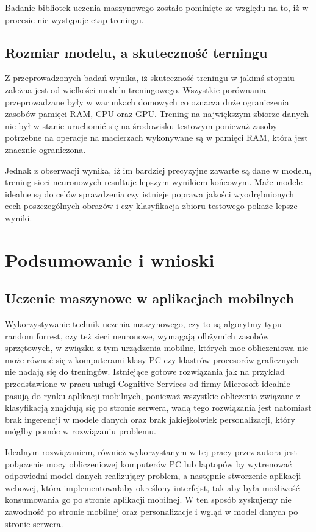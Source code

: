 \documentclass[brudnopis]{xmgr}
\begin{document}
Badanie bibliotek uczenia maszynowego zostało pominięte ze względu na to, iż w procesie nie występuje etap treningu.

\section{Rozmiar modelu, a skuteczność terningu}

Z przeprowadzonych badań wynika, iż skuteczność treningu w jakimś stopniu zależna jest od wielkości modelu treningowego. Wszystkie porównania przeprowadzane były w warunkach domowych co oznacza duże ograniczenia zasobów pamięci RAM, CPU oraz GPU. Trening na największym zbiorze danych nie był w stanie uruchomić się na środowisku testowym ponieważ zasoby potrzebne na operacje na macierzach wykonywane są w pamięci RAM, która jest znacznie ograniczona. 

Jednak z obserwacji wynika, iż im bardziej precyzyjne zawarte są dane w modelu, trening sieci neuronowych resultuje lepszym wynikiem końcowym. Małe modele idealne są do celów sprawdzenia czy istnieje poprawa jakości wyodrębnionych cech poszczególnych obrazów i czy klasyfikacja zbioru testowego pokaże lepsze wyniki.

\chapter{Podsumowanie i wnioski}

\section{Uczenie maszynowe w aplikacjach mobilnych}

Wykorzystywanie technik uczenia maszynowego, czy to są algorytmy typu random forrest, czy też sieci neuronowe, wymagają olbżymich zasobów sprzętowych, w związku z tym urządzenia mobilne, których moc obliczeniowa nie może równać się z komputerami klasy PC czy klastrów procesorów graficznych nie nadają się do treningów. Istniejące gotowe rozwiązania jak na przykład przedstawione w pracu usługi Cognitive Services od firmy Microsoft idealnie pasują do rynku aplikacji mobilnych, ponieważ wszystkie obliczenia związane z klasyfikacją znajdują się po stronie serwera, wadą tego rozwiązania jest natomiast brak ingerencji w modele danych oraz brak jakiejkolwiek personalizacji, który mógłby pomóc w rozwiązaniu problemu.

Idealnym rozwiązaniem, również wykorzystanym w tej pracy przez autora jest połączenie mocy obliczeniowej komputerów PC lub laptopów by wytrenować odpowiedni model danych realizujący problem, a następnie stworzenie aplikacji webowej, która implementowałaby określony interfejst, tak aby była możliwość konsumowania go po stronie aplikacji mobilnej. W ten sposób zyskujemy nie zawodność po stronie mobilnej oraz personalizacje i wgląd w model danych po stronie serwera.
\end{document}
